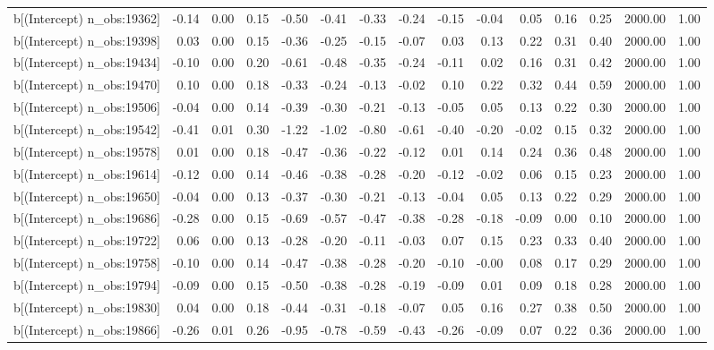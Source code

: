 \begin{table}[ht]
\begin{tabular}{rrrrrrrrrrrrrrr}
  b[(Intercept) n\_obs:19362] & -0.14 & 0.00 & 0.15 & -0.50 & -0.41 & -0.33 & -0.24 & -0.15 & -0.04 & 0.05 & 0.16 & 0.25 & 2000.00 & 1.00 \\ 
  b[(Intercept) n\_obs:19398] & 0.03 & 0.00 & 0.15 & -0.36 & -0.25 & -0.15 & -0.07 & 0.03 & 0.13 & 0.22 & 0.31 & 0.40 & 2000.00 & 1.00 \\ 
  b[(Intercept) n\_obs:19434] & -0.10 & 0.00 & 0.20 & -0.61 & -0.48 & -0.35 & -0.24 & -0.11 & 0.02 & 0.16 & 0.31 & 0.42 & 2000.00 & 1.00 \\ 
  b[(Intercept) n\_obs:19470] & 0.10 & 0.00 & 0.18 & -0.33 & -0.24 & -0.13 & -0.02 & 0.10 & 0.22 & 0.32 & 0.44 & 0.59 & 2000.00 & 1.00 \\ 
  b[(Intercept) n\_obs:19506] & -0.04 & 0.00 & 0.14 & -0.39 & -0.30 & -0.21 & -0.13 & -0.05 & 0.05 & 0.13 & 0.22 & 0.30 & 2000.00 & 1.00 \\ 
  b[(Intercept) n\_obs:19542] & -0.41 & 0.01 & 0.30 & -1.22 & -1.02 & -0.80 & -0.61 & -0.40 & -0.20 & -0.02 & 0.15 & 0.32 & 2000.00 & 1.00 \\ 
  b[(Intercept) n\_obs:19578] & 0.01 & 0.00 & 0.18 & -0.47 & -0.36 & -0.22 & -0.12 & 0.01 & 0.14 & 0.24 & 0.36 & 0.48 & 2000.00 & 1.00 \\ 
  b[(Intercept) n\_obs:19614] & -0.12 & 0.00 & 0.14 & -0.46 & -0.38 & -0.28 & -0.20 & -0.12 & -0.02 & 0.06 & 0.15 & 0.23 & 2000.00 & 1.00 \\ 
  b[(Intercept) n\_obs:19650] & -0.04 & 0.00 & 0.13 & -0.37 & -0.30 & -0.21 & -0.13 & -0.04 & 0.05 & 0.13 & 0.22 & 0.29 & 2000.00 & 1.00 \\ 
  b[(Intercept) n\_obs:19686] & -0.28 & 0.00 & 0.15 & -0.69 & -0.57 & -0.47 & -0.38 & -0.28 & -0.18 & -0.09 & 0.00 & 0.10 & 2000.00 & 1.00 \\ 
  b[(Intercept) n\_obs:19722] & 0.06 & 0.00 & 0.13 & -0.28 & -0.20 & -0.11 & -0.03 & 0.07 & 0.15 & 0.23 & 0.33 & 0.40 & 2000.00 & 1.00 \\ 
  b[(Intercept) n\_obs:19758] & -0.10 & 0.00 & 0.14 & -0.47 & -0.38 & -0.28 & -0.20 & -0.10 & -0.00 & 0.08 & 0.17 & 0.29 & 2000.00 & 1.00 \\ 
  b[(Intercept) n\_obs:19794] & -0.09 & 0.00 & 0.15 & -0.50 & -0.38 & -0.28 & -0.19 & -0.09 & 0.01 & 0.09 & 0.18 & 0.28 & 2000.00 & 1.00 \\ 
  b[(Intercept) n\_obs:19830] & 0.04 & 0.00 & 0.18 & -0.44 & -0.31 & -0.18 & -0.07 & 0.05 & 0.16 & 0.27 & 0.38 & 0.50 & 2000.00 & 1.00 \\ 
  b[(Intercept) n\_obs:19866] & -0.26 & 0.01 & 0.26 & -0.95 & -0.78 & -0.59 & -0.43 & -0.26 & -0.09 & 0.07 & 0.22 & 0.36 & 2000.00 & 1.00 \\ 

\end{tabular}
\end{table}
